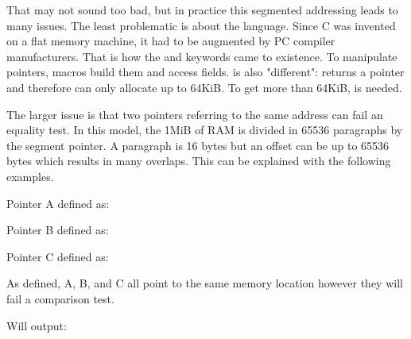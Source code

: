 \documentclass[book.tex]{subfiles}
\begin{document}
That may not sound too bad, but in practice this segmented addressing leads to many issues.
The least problematic is about the language. Since C was invented on a flat memory machine, it had to be augmented by PC compiler manufacturers. That is how the  and  keywords came to existence. To manipulate pointers, macros  build them and  access fields.  is also "different":  returns a  pointer and therefore can only allocate up to 64KiB. To get more than 64KiB,  is needed.\\
\par
The larger issue is that two pointers referring to the same address can fail an equality test. In this model, the 1MiB of RAM is divided in 65536 paragraphs by the segment pointer. A paragraph is 16 bytes but an offset can be up to 65536 bytes which results in many overlaps. This can be explained with the following examples.\\
\par
Pointer A defined as:\\
\par
\begin{minipage}{\textwidth}

\end{minipage}

\bigskip

Pointer B defined as:\\
\par
\begin{minipage}{\textwidth}

\end{minipage}

\bigskip

Pointer C defined as:\\
\par
\begin{minipage}{\textwidth}

\end{minipage}

As defined, A, B, and C all point to the same memory location however they will fail a comparison test.\\

\begin{minipage}{\textwidth}

\end{minipage}
\par
Will output:\\
\end{document}
